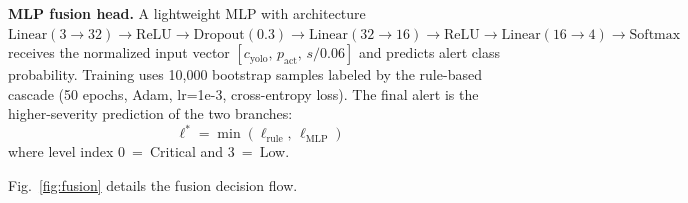 \documentclass[conference]{IEEEtran}
\begin{document}
\noindent\textbf{MLP fusion head.}
A lightweight MLP with architecture
$\text{Linear}(3\!\to\!32)\!\to\!\text{ReLU}\!\to\!\text{Dropout}(0.3)\!\to\!
\text{Linear}(32\!\to\!16)\!\to\!\text{ReLU}\!\to\!\text{Linear}(16\!\to\!4)
\!\to\!\text{Softmax}$
receives the normalized input vector
$[c_\text{yolo},\, p_\text{act},\, s/0.06]$ and predicts alert class
probability.
Training uses 10,000 bootstrap samples labeled by the rule-based cascade
(50 epochs, Adam, lr=1e-3, cross-entropy loss).
The final alert is the higher-severity prediction of the two branches:
\begin{equation}
  \ell^* = \min(\ell_\text{rule},\, \ell_\text{MLP})
\end{equation}
where level index 0~=~Critical and 3~=~Low.

Fig.~\ref{fig:fusion} details the fusion decision flow.
\end{document}
